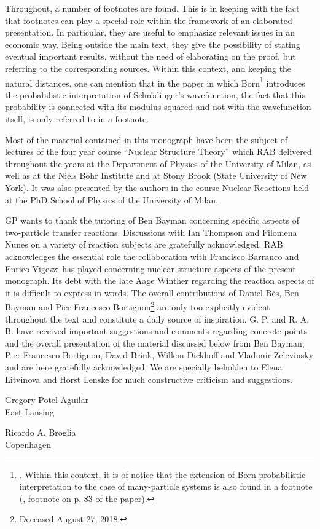 \newpage
Throughout, a number of footnotes are found. This is in keeping with the fact that footnotes can play a special role within the framework of an elaborated presentation. In particular, they are useful to emphasize relevant issues in an economic way. Being outside the main text, they give the possibility of stating eventual important results, without the need of elaborating on the proof, but referring to the corresponding sources.
 Within this context, and keeping the natural distances, one can mention that in the paper  in which Born\footnote{\cite{Born:26}. Within this context, it is of notice that the extension of Born probabilistic interpretation to the case of many-particle systems is also found in a footnote (\cite{Pauli:27}, footnote on p. 83 of the paper).} introduces the probabilistic interpretation of Schr\"odinger's  wavefunction, the fact that this probability is connected with its modulus squared and not with the wavefunction itself, is only referred to in a footnote.



  Most of the material contained in this monograph have been the subject of lectures of the four year course ``Nuclear Structure Theory'' which RAB delivered throughout the years at the Department of Physics of the University of Milan, as well as at the Niels Bohr Institute and at Stony Brook (State University of New York). It was also presented by the authors in the course Nuclear Reactions held at the PhD School of Physics of the University of Milan.

GP wants to thank the tutoring of  Ben Bayman concerning specific aspects of two-particle transfer reactions. Discussions with Ian Thompson and Filomena Nunes on a variety of reaction subjects are gratefully acknowledged. 
RAB  acknowledges the essential role the collaboration with Francisco Barranco and Enrico Vigezzi has played concerning  nuclear structure aspects of the present monograph. Its debt with the late Aage Winther regarding the reaction aspects of it is difficult to express in words. The overall contributions of Daniel B\`{e}s, Ben Bayman and Pier Francesco Bortignon\footnote{Deceased August 27, 2018.} are only too explicitly evident throughout the text and constitute a daily source of inspiration.  G. P. and R. A. B. have received important suggestions and comments regarding concrete points and the overall presentation of the material discussed below from Ben Bayman, Pier Francesco Bortignon, David Brink, Willem Dickhoff and Vladimir Zelevinsky and are here gratefully acknowledged. We are specially beholden to Elena Litvinova and Horst Lenske for much constructive criticism and suggestions.
\begin{flushleft}
Gregory Potel Aguilar\\
 East Lansing
\end{flushleft}
\vspace{-1.7cm}
\begin{flushright}
Ricardo A. Broglia\\
 Copenhagen
\end{flushright}

\renewcommand{\bibname}{Bibliography}


